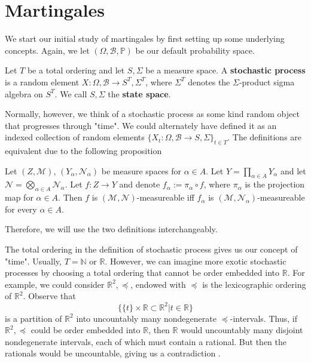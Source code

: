 \section{Martingales}
\label{martingale:martingales}

We start our initial study of martingales by first setting up some underlying concepts. Again, we let \((\Omega, \mathcal{B}, \mathbb{P})\) be our default probability space.

\begin{definition}
    Let \(T\) be a total ordering and let \(S, \Sigma\) be a measure space. A \textbf{stochastic process} is a random element \(X: \Omega, \mathcal{B} \to S^{T}, \Sigma^{T}\), where \(\Sigma^{T}\) denotes the \(\Sigma\)-product sigma algebra on \(S^{T}\). We call \(S, \Sigma\) the \textbf{state space}.
\end{definition}

Normally, however, we think of a stochastic process as some kind random object that progresses through "time". We could alternately have defined it as an indexed collection of random elements \(\{X_{t}: \Omega, \mathcal{B} \to S, \Sigma\}_{t \in T}\). The definitions are equivalent due to the following proposition

\begin{proposition}
    Let \((Z, \mathcal{M})\), $(Y_{\alpha}, \mathcal{N}_\alpha)$ be measure spaces for $\alpha \in A$. Let $Y = \prod\limits_{\alpha \in A} Y_\alpha$ and let $\mathcal{N} = \bigotimes\limits_{\alpha \in A} \mathcal{N}_\alpha$. Let $f : Z \to Y$ and denote $f_{\alpha} := \pi_{\alpha} \circ f$, where $\pi_\alpha$ is the projection map for $\alpha \in A$. Then $f$ is $(\mathcal{M}, \mathcal{N})$-measureable iff $f_\alpha$ is $(\mathcal{M}, \mathcal{N}_\alpha)$-measureable for every $\alpha \in A$.
\end{proposition}

Therefore, we will use the two definitions interchangeably.

The total ordering in the definition of stochastic process gives us our concept of "time". Usually, \(T = \mathbb{N}\) or \(\mathbb{R}\). However, we can imagine more exotic stochastic processes by choosing a total ordering that cannot be order embedded into \(\mathbb{R}\). For example, we could consider \(\mathbb{R}^{2}, \preccurlyeq\), endowed with \(\preccurlyeq\) is the lexicographic ordering of \(\mathbb{R}^{2}\). Observe that 
\[\{\{t\} \times \mathbb{R} \subset \mathbb{R}^{2} | t \in \mathbb{R}\}\]
is a partition of \(\mathbb{R}^{2}\) into uncountably many nondegenerate \(\preccurlyeq\)-intervals. Thus, if \(\mathbb{R}^{2}, \preccurlyeq\) could be order embedded into \(\mathbb{R}\), then \(\mathbb{R}\) would uncountably many disjoint nondegenerate intervals, each of which must contain a rational. But then the rationals would be uncountable, giving us a contradiction \cite{exotic_order}.

